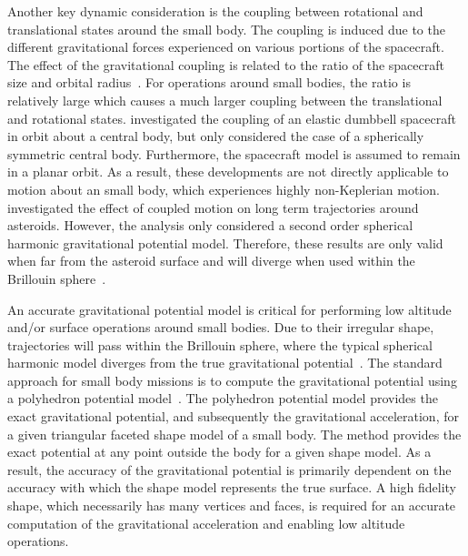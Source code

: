 Another key dynamic consideration is the coupling between rotational and translational states around the small body.
The coupling is induced due to the different gravitational forces experienced on various portions of the spacecraft. 
The effect of the gravitational coupling is related to the ratio of the spacecraft size and orbital radius~\cite{hughes2004}.
For operations around small bodies, the ratio is relatively large which causes a much larger coupling between the translational and rotational states.
\Textcite{elmasri2005,sanyal2004a} investigated the coupling of an elastic dumbbell spacecraft in orbit about a central body, but only considered the case of a spherically symmetric central body.
Furthermore, the spacecraft model is assumed to remain in a planar orbit.
As a result, these developments are not directly applicable to motion about an small body, which experiences highly non-Keplerian motion.
\Textcite{misra2015b} investigated the effect of coupled motion on long term trajectories around asteroids.
However, the analysis only considered a second order spherical harmonic gravitational potential model. 
Therefore, these results are only valid when far from the asteroid surface and will diverge when used within the Brillouin sphere~\cite{scheeres2012a}.

An accurate gravitational potential model is critical for performing low altitude and/or surface operations around small bodies.
Due to their irregular shape, trajectories will pass within the Brillouin sphere, where the typical spherical harmonic model diverges from the true gravitational potential~\cite{scheeres2012a}.
The standard approach for small body missions is to compute the gravitational potential using a polyhedron potential model~\cite{werner1996}.
The polyhedron potential model provides the exact gravitational potential, and subsequently the gravitational acceleration, for a given triangular faceted shape model of a small body.
The method provides the exact potential at any point outside the body for a given shape model.
As a result, the accuracy of the gravitational potential is primarily dependent on the accuracy with which the shape model represents the true surface.
A high fidelity shape, which necessarily has many vertices and faces, is required for an accurate computation of the gravitational acceleration and enabling low altitude operations.

